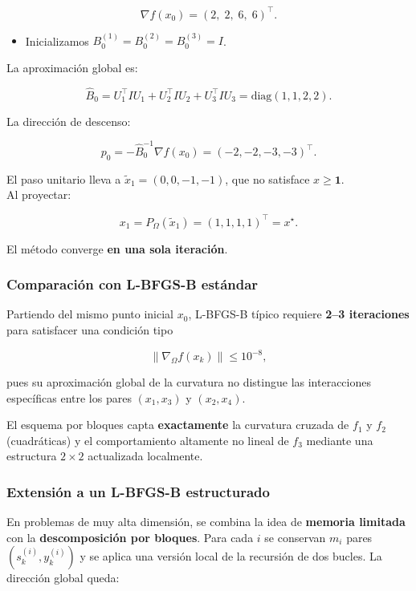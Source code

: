 \documentclass[
  spanish,
  us-letterpaper,
]{scrreprt}
\providecommand{\tightlist}{%
  \setlength{\itemsep}{0pt}\setlength{\parskip}{0pt}}
\numberwithin{equation}{section}
\begin{document}
\[
\nabla f(x_0)=(2,\;2,\;6,\;6)^\top.
\]

\begin{itemize}
\tightlist
\item
  Inicializamos \(B_0^{(1)}=B_0^{(2)}=B_0^{(3)}=I\).
\end{itemize}

La aproximación global es:

\[
\widehat{B}_0 = U_1^\top I U_1 + U_2^\top I U_2 + U_3^\top I U_3
= \mathrm{diag}(1,1,2,2).
\]

La dirección de descenso:

\[
p_0 = -\widehat{B}_0^{-1}\nabla f(x_0)
= (-2,-2,-3,-3)^\top.
\]

El paso unitario lleva a \(\tilde{x}_1=(0,0,-1,-1)\), que no satisface
\(x\ge\mathbf{1}\).\\
Al proyectar:

\[
x_1 = P_\Omega(\tilde{x}_1) = (1,1,1,1)^\top = x^\star.
\]

El método converge \textbf{en una sola iteración}.

\subsubsection{Comparación con L-BFGS-B
estándar}\label{comparaciuxf3n-con-l-bfgs-b-estuxe1ndar}

Partiendo del mismo punto inicial \(x_0\), L-BFGS-B típico requiere
\textbf{2--3 iteraciones} para satisfacer una condición tipo

\[
\|\nabla_\Omega f(x_k)\|\le 10^{-8},
\]

pues su aproximación global de la curvatura no distingue las
interacciones específicas entre los pares \((x_1,x_3)\) y \((x_2,x_4)\).

El esquema por bloques capta \textbf{exactamente} la curvatura cruzada
de \(f_1\) y \(f_2\) (cuadráticas) y el comportamiento altamente no
lineal de \(f_3\) mediante una estructura \(2\times2\) actualizada
localmente.

\subsubsection{Extensión a un L-BFGS-B
estructurado}\label{extensiuxf3n-a-un-l-bfgs-b-estructurado}

En problemas de muy alta dimensión, se combina la idea de
\textbf{memoria limitada} con la \textbf{descomposición por bloques}.
Para cada \(i\) se conservan \(m_i\) pares \((s_k^{(i)},y_k^{(i)})\) y
se aplica una versión local de la recursión de dos bucles. La dirección
global queda:
\end{document}
